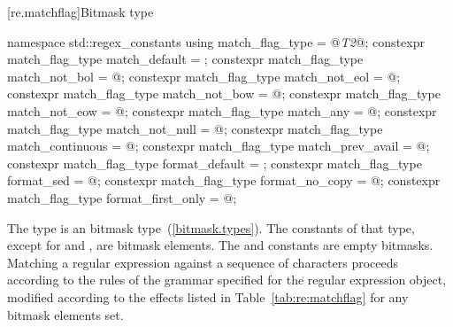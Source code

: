 [re.matchflag]{Bitmask type }

%
%
%
%
%
%
%
%
%
%
%
%
%
%
%
\begin{codeblock}
namespace std::regex_constants {
  using match_flag_type = @\textit{T2}@;
  constexpr match_flag_type match_default = {};
  constexpr match_flag_type match_not_bol = @\unspec@;
  constexpr match_flag_type match_not_eol = @\unspec@;
  constexpr match_flag_type match_not_bow = @\unspec@;
  constexpr match_flag_type match_not_eow = @\unspec@;
  constexpr match_flag_type match_any = @\unspec@;
  constexpr match_flag_type match_not_null = @\unspec@;
  constexpr match_flag_type match_continuous = @\unspec@;
  constexpr match_flag_type match_prev_avail = @\unspec@;
  constexpr match_flag_type format_default = {};
  constexpr match_flag_type format_sed = @\unspec@;
  constexpr match_flag_type format_no_copy = @\unspec@;
  constexpr match_flag_type format_first_only = @\unspec@;
}
\end{codeblock}

\pnum
{}%
The type  is an
 bitmask type~(\ref{bitmask.types}).
The constants of that type, except for  and
, are bitmask elements. The  and
 constants are empty bitmasks.
Matching a regular expression against a sequence of characters
 proceeds according to the rules of the grammar specified for the regular
expression object, modified according to the effects listed in Table~\ref{tab:re:matchflag} for
any bitmask elements set.


